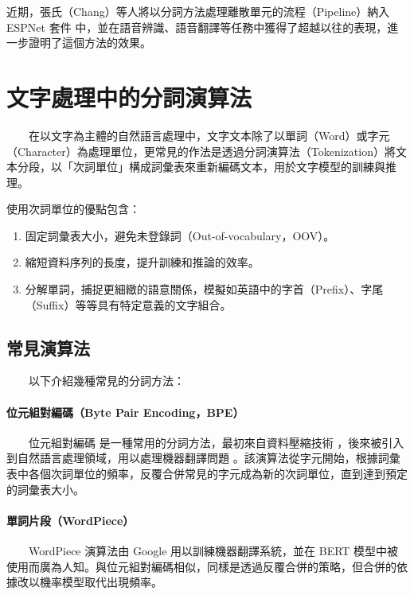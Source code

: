         近期，張氏（Chang）等人\cite{chang_exploring_2024}將以分詞方法處理離散單元的流程（Pipeline）納入 ESPNet 套件 \cite{watanabe2018espnet} 中，並在語音辨識、語音翻譯等任務中獲得了超越以往的表現，進一步證明了這個方法的效果。

\section{文字處理中的分詞演算法}

　　在以文字為主體的自然語言處理中，文字文本除了以單詞（Word）或字元（Character）為處理單位，更常見的作法是透過分詞演算法（Tokenization）將文本分段，以「次詞單位」構成詞彙表來重新編碼文本，用於文字模型的訓練與推理。

        使用次詞單位的優點包含：
            \begin{enumerate}
                \item 固定詞彙表大小，避免未登錄詞（Out-of-vocabulary，OOV）。
                \item 縮短資料序列的長度，提升訓練和推論的效率。
                \item 分解單詞，捕捉更細緻的語意關係，模擬如英語中的字首（Prefix）、字尾（Suffix）等等具有特定意義的文字組合。
            \end{enumerate}

\subsection{常見演算法}

　　以下介紹幾種常見的分詞方法：

\paragraph{位元組對編碼（Byte Pair Encoding，BPE）} \hfill \break
%
　　位元組對編碼 \cite{10.5555/177910.177914, sennrich_neural_2016} 是一種常用的分詞方法，最初來自資料壓縮技術 \cite{10.5555/177910.177914}，後來被引入到自然語言處理領域，用以處理機器翻譯問題 \cite{sennrich_neural_2016} 。該演算法從字元開始，根據詞彙表中各個次詞單位的頻率，反覆合併常見的字元成為新的次詞單位，直到達到預定的詞彙表大小。

\paragraph{單詞片段（WordPiece）} \hfill \break
%
　　WordPiece \cite{wu2016google} 演算法由 Google 用以訓練機器翻譯系統，並在 BERT \cite{devlin_bert_2019} 模型中被使用而廣為人知。與位元組對編碼相似，同樣是透過反覆合併的策略，但合併的依據改以機率模型取代出現頻率。

